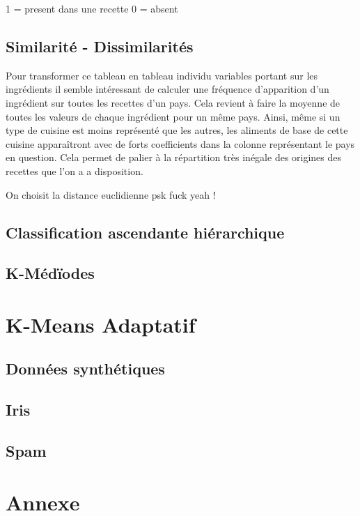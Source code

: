 \documentclass[a4paper, titlepage]{report}
\begin{document}
1 = present dans une recette 
0 = absent

\section{Similarité - Dissimilarités}

Pour transformer ce tableau en tableau individu variables portant sur les ingrédients il semble intéressant de calculer une fréquence d'apparition d'un ingrédient sur toutes les recettes d'un pays. Cela revient à faire la moyenne de toutes les valeurs de chaque ingrédient pour un même pays. Ainsi, même si un type de cuisine est moins représenté que les autres, les aliments de base de cette cuisine apparaîtront avec de forts coefficients dans la colonne représentant le pays en question.
Cela permet de palier à la répartition très inégale des origines des recettes que l'on a a disposition.

On choisit la distance euclidienne psk fuck yeah !


\section{Classification ascendante hiérarchique}

\section{K-Médïodes}



\chapter{K-Means Adaptatif}


\section{Données synthétiques}

\section{Iris}

\section{Spam}



\chapter*{Annexe}

\end{document}
